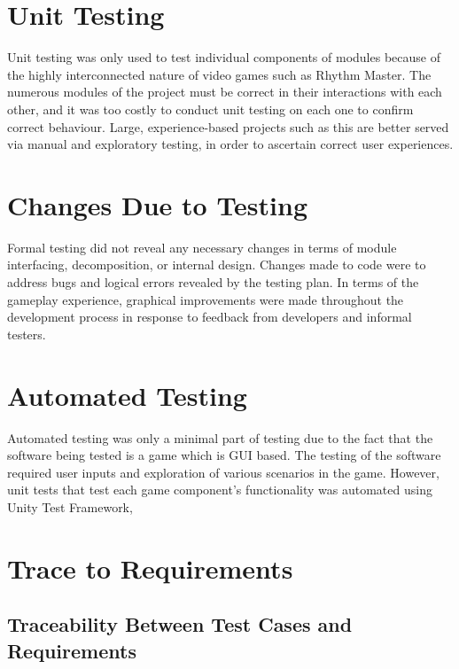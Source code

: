 \documentclass[12pt, titlepage]{article}
\begin{document}
\section{Unit Testing}
Unit testing was only used to test individual components of modules because of the highly interconnected nature of video games such as Rhythm Master. The numerous modules of the project must be correct in their interactions with each other, and it was too costly to conduct unit testing on each one to confirm correct behaviour. Large, experience-based projects such as this are better served via manual and exploratory testing, in order to ascertain correct user experiences.

\section{Changes Due to Testing}
Formal testing did not reveal any necessary changes in terms of module interfacing, decomposition, or internal design. Changes made to code were to address bugs and logical errors revealed by the testing plan. In terms of the gameplay experience, graphical improvements were made throughout the development process in response to feedback from developers and informal testers.

\section{Automated Testing}
Automated testing was only a minimal part of testing due to the fact that the software being tested is a game which is GUI based. The testing of the software required user inputs and exploration of various scenarios in the game. However, unit tests that test each game component's functionality was automated using Unity Test Framework,  

\newpage
		
\section{Trace to Requirements}
\subsection{Traceability Between Test Cases and Requirements}
\end{document}
